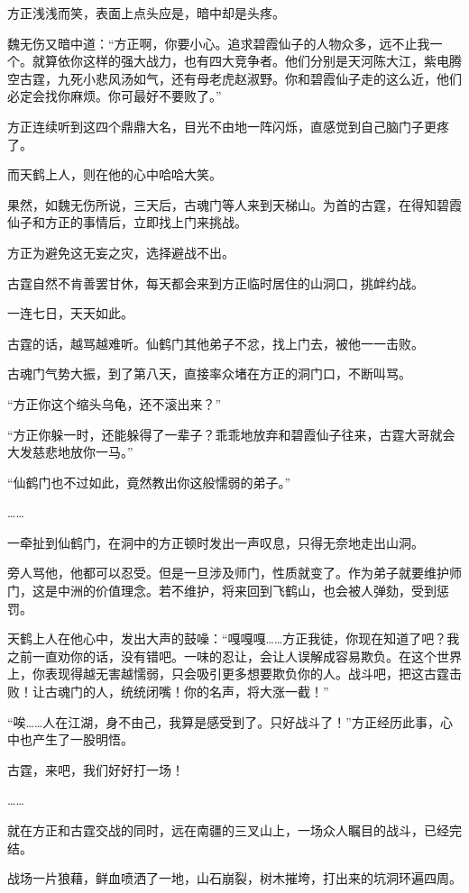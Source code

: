 \begin{this_body}
方正浅浅而笑，表面上点头应是，暗中却是头疼。

魏无伤又暗中道：“方正啊，你要小心。追求碧霞仙子的人物众多，远不止我一个。就算依你这样的强大战力，也有四大竞争者。他们分别是天河陈大江，紫电腾空古霆，九死小悲风汤如气，还有母老虎赵淑野。你和碧霞仙子走的这么近，他们必定会找你麻烦。你可最好不要败了。”

方正连续听到这四个鼎鼎大名，目光不由地一阵闪烁，直感觉到自己脑门子更疼了。

而天鹤上人，则在他的心中哈哈大笑。

果然，如魏无伤所说，三天后，古魂门等人来到天梯山。为首的古霆，在得知碧霞仙子和方正的事情后，立即找上门来挑战。

方正为避免这无妄之灾，选择避战不出。

古霆自然不肯善罢甘休，每天都会来到方正临时居住的山洞口，挑衅约战。

一连七日，天天如此。

古霆的话，越骂越难听。仙鹤门其他弟子不忿，找上门去，被他一一击败。

古魂门气势大振，到了第八天，直接率众堵在方正的洞门口，不断叫骂。

“方正你这个缩头乌龟，还不滚出来？”

“方正你躲一时，还能躲得了一辈子？乖乖地放弃和碧霞仙子往来，古霆大哥就会大发慈悲地放你一马。”

“仙鹤门也不过如此，竟然教出你这般懦弱的弟子。”

……

一牵扯到仙鹤门，在洞中的方正顿时发出一声叹息，只得无奈地走出山洞。

旁人骂他，他都可以忍受。但是一旦涉及师门，性质就变了。作为弟子就要维护师门，这是中洲的价值理念。若不维护，将来回到飞鹤山，也会被人弹劾，受到惩罚。

天鹤上人在他心中，发出大声的鼓噪：“嘎嘎嘎……方正我徒，你现在知道了吧？我之前一直劝你的话，没有错吧。一味的忍让，会让人误解成容易欺负。在这个世界上，你表现得越无害越懦弱，只会吸引更多想要欺负你的人。战斗吧，把这古霆击败！让古魂门的人，统统闭嘴！你的名声，将大涨一截！”

“唉……人在江湖，身不由己，我算是感受到了。只好战斗了！”方正经历此事，心中也产生了一股明悟。

古霆，来吧，我们好好打一场！

……

就在方正和古霆交战的同时，远在南疆的三叉山上，一场众人瞩目的战斗，已经完结。

战场一片狼藉，鲜血喷洒了一地，山石崩裂，树木摧垮，打出来的坑洞环遍四周。


\end{this_body}
